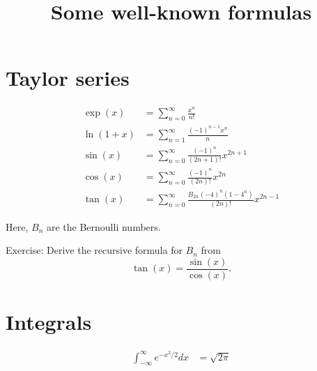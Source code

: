 \documentclass{article}
\title{Some well-known formulas}
\author{}
\date{}
\begin{document}
\maketitle

\section{Taylor series}

\begin{align*}
\exp(x) &= \sum_{n=0}^{\infty} \frac{x^n}{n!}\\
\ln(1 + x) &= \sum_{n=1}^{\infty} \frac{(-1)^{n-1} x^n}{n}\\
\sin(x) &= \sum_{n=0}^{\infty} \frac{(-1)^n}{(2n+1)!} x^{2n+1}\\
\cos(x) &= \sum_{n=0}^{\infty} \frac{(-1)^n}{(2n)!} x^{2n}\\
\tan(x) &= \sum_{n=0}^{\infty} \frac{B_{2n} (-4)^n (1 - 4^n)}{(2n)!} x^{2n-1}
\end{align*}

Here, $B_n$ are the Bernoulli numbers.

Exercise: Derive the recursive formula for $B_n$ from
$$\tan(x) = \frac{\sin(x)}{\cos(x)}.$$


\section{Integrals}

\begin{align*}
\int_{-\infty}^{\infty} e^{-x^2/2} dx &= \sqrt{2\pi}
\end{align*}
\end{document}
